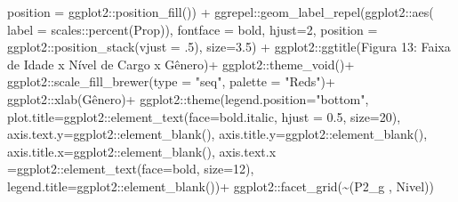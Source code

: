 \documentclass[
]{article}
\newenvironment{Shaded}{\begin{snugshade}}{\end{snugshade}}
\newcommand{\AttributeTok}[1]{\textcolor[rgb]{0.77,0.63,0.00}{#1}}
\newcommand{\DecValTok}[1]{\textcolor[rgb]{0.00,0.00,0.81}{#1}}
\newcommand{\FloatTok}[1]{\textcolor[rgb]{0.00,0.00,0.81}{#1}}
\newcommand{\FunctionTok}[1]{\textcolor[rgb]{0.00,0.00,0.00}{#1}}
\newcommand{\NormalTok}[1]{#1}
\newcommand{\SpecialCharTok}[1]{\textcolor[rgb]{0.00,0.00,0.00}{#1}}
\newcommand{\StringTok}[1]{\textcolor[rgb]{0.31,0.60,0.02}{#1}}
\begin{document}
\begin{Shaded}
\begin{Highlighting}[]
                     \AttributeTok{position =}\NormalTok{ ggplot2}\SpecialCharTok{::}\FunctionTok{position\_fill}\NormalTok{()) }\SpecialCharTok{+}
\NormalTok{  ggrepel}\SpecialCharTok{::}\FunctionTok{geom\_label\_repel}\NormalTok{(ggplot2}\SpecialCharTok{::}\FunctionTok{aes}\NormalTok{(}
    \AttributeTok{label =}\NormalTok{ scales}\SpecialCharTok{::}\FunctionTok{percent}\NormalTok{(Prop)),}
    \AttributeTok{fontface =} \StringTok{\textquotesingle{}bold\textquotesingle{}}\NormalTok{,}
    \AttributeTok{hjust=}\DecValTok{2}\NormalTok{,}
    \AttributeTok{position =}\NormalTok{ ggplot2}\SpecialCharTok{::}\FunctionTok{position\_stack}\NormalTok{(}\AttributeTok{vjust =}\NormalTok{ .}\DecValTok{5}\NormalTok{),}
    \AttributeTok{size=}\FloatTok{3.5}\NormalTok{) }\SpecialCharTok{+}
\NormalTok{  ggplot2}\SpecialCharTok{::}\FunctionTok{ggtitle}\NormalTok{(}\StringTok{\textquotesingle{}Figura 13: Faixa de Idade x Nível de Cargo x Gênero\textquotesingle{}}\NormalTok{)}\SpecialCharTok{+}
\NormalTok{  ggplot2}\SpecialCharTok{::}\FunctionTok{theme\_void}\NormalTok{()}\SpecialCharTok{+}
\NormalTok{  ggplot2}\SpecialCharTok{::}\FunctionTok{scale\_fill\_brewer}\NormalTok{(}\AttributeTok{type =} \StringTok{"seq"}\NormalTok{, }\AttributeTok{palette =} \StringTok{"Reds"}\NormalTok{)}\SpecialCharTok{+}
\NormalTok{  ggplot2}\SpecialCharTok{::}\FunctionTok{xlab}\NormalTok{(}\StringTok{\textquotesingle{}Gênero\textquotesingle{}}\NormalTok{)}\SpecialCharTok{+}
\NormalTok{  ggplot2}\SpecialCharTok{::}\FunctionTok{theme}\NormalTok{(}\AttributeTok{legend.position=}\StringTok{"bottom"}\NormalTok{,}
                 \AttributeTok{plot.title=}\NormalTok{ggplot2}\SpecialCharTok{::}\FunctionTok{element\_text}\NormalTok{(}\AttributeTok{face=}\StringTok{\textquotesingle{}bold.italic\textquotesingle{}}\NormalTok{,}
                                                  \AttributeTok{hjust =} \FloatTok{0.5}\NormalTok{, }\AttributeTok{size=}\DecValTok{20}\NormalTok{),}
                 \AttributeTok{axis.text.y=}\NormalTok{ggplot2}\SpecialCharTok{::}\FunctionTok{element\_blank}\NormalTok{(),}
                 \AttributeTok{axis.title.y=}\NormalTok{ggplot2}\SpecialCharTok{::}\FunctionTok{element\_blank}\NormalTok{(),}
                 \AttributeTok{axis.title.x=}\NormalTok{ggplot2}\SpecialCharTok{::}\FunctionTok{element\_blank}\NormalTok{(),}
                 \AttributeTok{axis.text.x =}\NormalTok{ggplot2}\SpecialCharTok{::}\FunctionTok{element\_text}\NormalTok{(}\AttributeTok{face=}\StringTok{\textquotesingle{}bold\textquotesingle{}}\NormalTok{, }\AttributeTok{size=}\DecValTok{12}\NormalTok{),}
                 \AttributeTok{legend.title=}\NormalTok{ggplot2}\SpecialCharTok{::}\FunctionTok{element\_blank}\NormalTok{())}\SpecialCharTok{+}
\NormalTok{  ggplot2}\SpecialCharTok{::}\FunctionTok{facet\_grid}\NormalTok{(}\SpecialCharTok{\textasciitilde{}}\StringTok{\textasciigrave{}}\AttributeTok{(\textquotesingle{}P2\_g \textquotesingle{}, \textquotesingle{}Nivel\textquotesingle{})}\StringTok{\textasciigrave{}}\NormalTok{)}
\end{Highlighting}
\end{Shaded}
\end{document}
